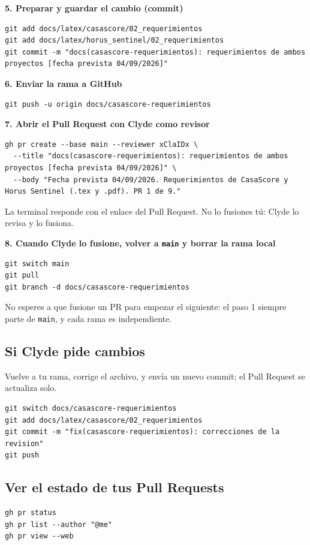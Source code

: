 \documentclass[11pt,a4paper]{article}
\begin{document}
\noindent\textbf{5. Preparar y guardar el cambio (commit)}
\begin{lstlisting}
git add docs/latex/casascore/02_requerimientos
git add docs/latex/horus_sentinel/02_requerimientos
git commit -m "docs(casascore-requerimientos): requerimientos de ambos proyectos [fecha prevista 04/09/2026]"
\end{lstlisting}

\noindent\textbf{6. Enviar la rama a GitHub}
\begin{lstlisting}
git push -u origin docs/casascore-requerimientos
\end{lstlisting}

\noindent\textbf{7. Abrir el Pull Request con Clyde como revisor}
\begin{lstlisting}
gh pr create --base main --reviewer xClaIDx \
  --title "docs(casascore-requerimientos): requerimientos de ambos proyectos [fecha prevista 04/09/2026]" \
  --body "Fecha prevista 04/09/2026. Requerimientos de CasaScore y Horus Sentinel (.tex y .pdf). PR 1 de 9."
\end{lstlisting}

\noindent La terminal responde con el enlace del Pull Request. No lo fusiones tú: Clyde lo revisa y lo fusiona.

\vspace{0.1cm}
\noindent\textbf{8. Cuando Clyde lo fusione, volver a \texttt{main} y borrar la rama local}
\begin{lstlisting}
git switch main
git pull
git branch -d docs/casascore-requerimientos
\end{lstlisting}

\noindent No esperes a que fusione un PR para empezar el siguiente: el paso 1 siempre parte de \texttt{main}, y cada rama es independiente.

\Needspace{12\baselineskip}
\subsection{Si Clyde pide cambios}
Vuelve a tu rama, corrige el archivo, y envía un nuevo commit; el Pull Request se actualiza solo.
\begin{lstlisting}
git switch docs/casascore-requerimientos
git add docs/latex/casascore/02_requerimientos
git commit -m "fix(casascore-requerimientos): correcciones de la revision"
git push
\end{lstlisting}

\subsection{Ver el estado de tus Pull Requests}
\begin{lstlisting}
gh pr status
gh pr list --author "@me"
gh pr view --web
\end{lstlisting}
\end{document}
